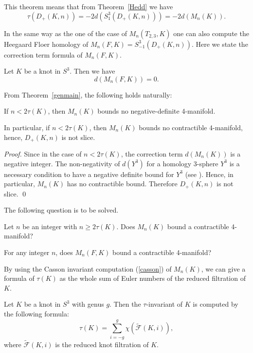 \documentclass[11pt]{amsart}
\begin{document}
This theorem means that from Theorem~\ref{Hedd} we have
$$\tau(D_+(K,n))=-2d(S^3_1(D_+(K,n)))=-2d(M_n(K)).$$

In the same way as the one of the case of $M_n(T_{2,3},K)$ one can also compute the Heegaard Floer homology of $M_n(F,K)=S^3_{-1}(D_+(K,n))$.
Here we state the correction term formula of $M_n(F,K)$.
\begin{thm}
\label{fig8}
Let $K$ be a knot in $S^3$.
Then we have
$$d(M_n(F,K))=0.$$
\end{thm}
From Theorem~\ref{genmain}, the following holds naturally:
\begin{cor}
If $n<2\tau(K)$, then $M_n(K)$ bounds no negative-definite 4-manifold.

In particular, if $n<2\tau(K)$, then $M_n(K)$ bounds no contractible 4-manifold, hence, $D_+(K,n)$
is not slice.
\end{cor}
\begin{proof}
Since in the case of $n<2\tau(K)$, the correction term $d(M_n(K))$ is a negative integer.
The non-negativity of $d(Y^3)$ for a homology 3-sphere $Y^3$ is a necessary condition to have
a negative definite bound for $Y^3$ (see \cite{OS1}).
Hence, in particular, $M_n(K)$ has no contractible bound.
Therefore $D_+(K,n)$ is not slice.
\qed
\end{proof}
The following question is to be solved.
\begin{que}
Let $n$ be an integer with $n\ge 2\tau(K)$.
Does $M_n(K)$ bound a contractible 4-manifold?

For any integer $n$, does $M_n(F,K)$ bound a contractible 4-manifold?
\end{que}
By using the Casson invariant computation (\ref{casson}) of $M_n(K)$, we can give a formula of $\tau(K)$ as the whole sum of Euler numbers of the reduced filtration of $K$.
\begin{cor}
\label{filtEul}
Let $K$ be a knot in $S^3$ with genus $g$.
Then the $\tau$-invariant of $K$ is computed by the following formula:
$$\tau(K)=\sum_{i=-g}^g\chi(\widetilde{{\mathcal F}}(K,i)),$$
where $\widetilde{{\mathcal F}}(K,i)$ is the reduced knot filtration of $K$.
\end{cor}
\end{document}
